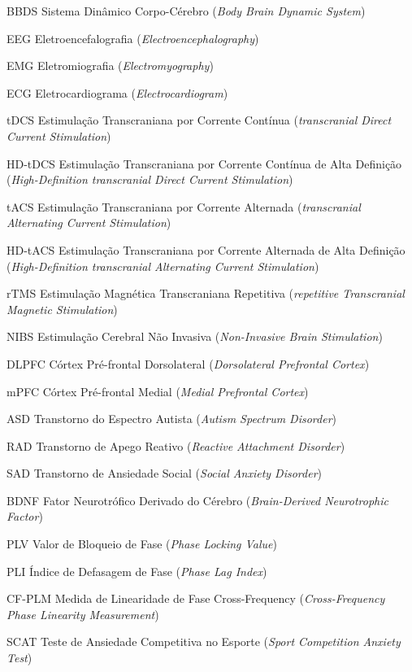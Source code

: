 \documentclass[
  12pt,
  openany,
  twoside,
  a4paper,
  english,
  brazil
]{abntex2}
\begin{document}
\begin{siglas}
  \item[BBDS] Sistema Dinâmico Corpo-Cérebro (\textit{Body Brain Dynamic System})
  \item[EEG] Eletroencefalografia (\textit{Electroencephalography})
  \item[EMG] Eletromiografia (\textit{Electromyography})
  \item[ECG] Eletrocardiograma (\textit{Electrocardiogram})
  \item[tDCS] Estimulação Transcraniana por Corrente Contínua (\textit{transcranial Direct Current Stimulation})
  \item[HD-tDCS] Estimulação Transcraniana por Corrente Contínua de Alta Definição (\textit{High-Definition transcranial Direct Current Stimulation})
  \item[tACS] Estimulação Transcraniana por Corrente Alternada (\textit{transcranial Alternating Current Stimulation})
  \item[HD-tACS] Estimulação Transcraniana por Corrente Alternada de Alta Definição (\textit{High-Definition transcranial Alternating Current Stimulation})
  \item[rTMS] Estimulação Magnética Transcraniana Repetitiva (\textit{repetitive Transcranial Magnetic Stimulation})
  \item[NIBS] Estimulação Cerebral Não Invasiva (\textit{Non-Invasive Brain Stimulation})
  \item[DLPFC] Córtex Pré-frontal Dorsolateral (\textit{Dorsolateral Prefrontal Cortex})
  \item[mPFC] Córtex Pré-frontal Medial (\textit{Medial Prefrontal Cortex})
  \item[ASD] Transtorno do Espectro Autista (\textit{Autism Spectrum Disorder})
  \item[RAD] Transtorno de Apego Reativo (\textit{Reactive Attachment Disorder})
  \item[SAD] Transtorno de Ansiedade Social (\textit{Social Anxiety Disorder})
  \item[BDNF] Fator Neurotrófico Derivado do Cérebro (\textit{Brain-Derived Neurotrophic Factor})
  \item[PLV] Valor de Bloqueio de Fase (\textit{Phase Locking Value})
  \item[PLI] Índice de Defasagem de Fase (\textit{Phase Lag Index})
  \item[CF-PLM] Medida de Linearidade de Fase Cross-Frequency (\textit{Cross-Frequency Phase Linearity Measurement})
  \item[SCAT] Teste de Ansiedade Competitiva no Esporte (\textit{Sport Competition Anxiety Test})

\end{siglas}
\end{document}
